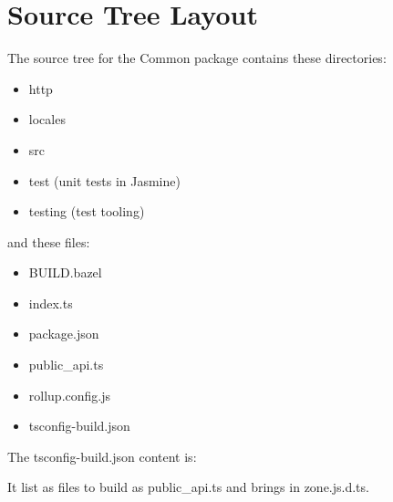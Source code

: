 \section{Source Tree Layout}

The source tree for the Common package contains these directories:

\begin{itemize}
  \item http
  \item locales
  \item src
  \item test (unit tests in Jasmine)
  \item testing (test tooling)
\end{itemize}

and these files:

\begin{itemize}
  \item BUILD.bazel
  \item index.ts
  \item package.json
  \item public\_api.ts
  \item rollup.config.js
  \item tsconfig-build.json
\end{itemize}

The tsconfig-build.json content is:



It list as files to build as public\_api.ts and brings in zone.js.d.ts.
